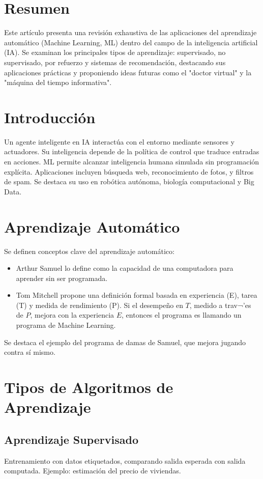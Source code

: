 \documentclass[12pt]{article}
\begin{document}
\section*{Resumen}
Este art\'iculo presenta una revisi\'on exhaustiva de las aplicaciones del aprendizaje autom\'atico (Machine Learning, ML) dentro del campo de la inteligencia artificial (IA). Se examinan los principales tipos de aprendizaje: supervisado, no supervisado, por refuerzo y sistemas de recomendaci\'on, destacando sus aplicaciones pr\'acticas y proponiendo ideas futuras como el "doctor virtual" y la "m\'aquina del tiempo informativa".

\section{Introducci\'on}
Un agente inteligente en IA interact\'ua con el entorno mediante sensores y actuadores. Su inteligencia depende de la pol\'itica de control que traduce entradas en acciones. ML permite alcanzar inteligencia humana simulada sin programaci\'on expl\'icita. Aplicaciones incluyen b\'usqueda web, reconocimiento de fotos, y filtros de spam. Se destaca su uso en rob\'otica aut\'onoma, biolog\'ia computacional y Big Data.

\section{Aprendizaje Autom\'atico}
Se definen conceptos clave del aprendizaje autom\'atico:
\begin{itemize}
  \item Arthur Samuel lo define como la capacidad de una computadora para aprender sin ser programada.
  \item Tom Mitchell propone una definici\'on formal basada en experiencia (E), tarea (T) y medida de rendimiento (P). Si el desempe\~no en $T$, medido a trav¬'es de $P$, mejora con la experiencia  $E$, entonces el programa es llamando un programa de Machine Learning.
\end{itemize}
Se destaca el ejemplo del programa de damas de Samuel, que mejora jugando contra s\'i mismo.



\section{Tipos de Algoritmos de Aprendizaje}
\subsection{Aprendizaje Supervisado}
Entrenamiento con datos etiquetados, comparando salida esperada con salida computada. Ejemplo: estimaci\'on del precio de viviendas.
\end{document}
